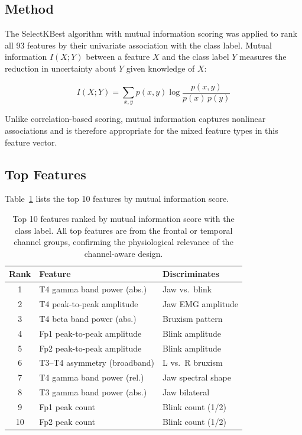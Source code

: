 \subsection{Method}

The SelectKBest algorithm with mutual information scoring
was applied to rank all 93 features by their univariate
association with the class label. Mutual information
$I(X; Y)$ between a feature $X$ and the class label $Y$
measures the reduction in uncertainty about $Y$ given
knowledge of $X$:

\begin{equation}
I(X; Y) = \sum_{x, y} p(x, y) \log
\frac{p(x, y)}{p(x)\,p(y)}
\label{eq:mutual_info}
\end{equation}

Unlike correlation-based scoring, mutual information
captures nonlinear associations and is therefore appropriate
for the mixed feature types in this feature vector.

\subsection{Top Features}

Table~\ref{tab:top_features} lists the top 10 features by
mutual information score.

\begin{table}[htbp]
\centering
\caption{Top 10 features ranked by mutual information score
with the class label. All top features are from the frontal
or temporal channel groups, confirming the physiological
relevance of the channel-aware design.}
\label{tab:top_features}
\renewcommand{\arraystretch}{1.3}
\begin{tabular}{c p{4.5cm} p{3.0cm}}
\toprule
\textbf{Rank} & \textbf{Feature} & \textbf{Discriminates} \\
\midrule
1  & T4 gamma band power (abs.)    & Jaw vs.\ blink \\
2  & T4 peak-to-peak amplitude     & Jaw EMG amplitude \\
3  & T4 beta band power (abs.)     & Bruxism pattern \\
4  & Fp1 peak-to-peak amplitude    & Blink amplitude \\
5  & Fp2 peak-to-peak amplitude    & Blink amplitude \\
6  & T3--T4 asymmetry (broadband)  & L vs.\ R bruxism \\
7  & T4 gamma band power (rel.)    & Jaw spectral shape \\
8  & T3 gamma band power (abs.)    & Jaw bilateral \\
9  & Fp1 peak count                & Blink count (1/2) \\
10 & Fp2 peak count                & Blink count (1/2) \\
\bottomrule
\end{tabular}
\end{table}

